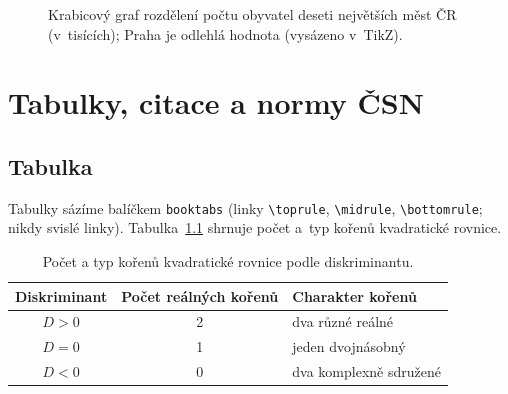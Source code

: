 \documentclass[11pt, a4paper, oneside]{book}
\begin{document}
\begin{figure}[htbp]
\centering
{}
\caption{Krabicový graf rozdělení počtu obyvatel deseti největších měst ČR
(v~tisících); Praha je odlehlá hodnota (vysázeno v~TikZ).}
\label{fig:graf-boxplot}
\end{figure}

\chapter{Tabulky, citace a normy ČSN}
\label{ch:normy}

\section{Tabulka}

Tabulky sázíme balíčkem \texttt{booktabs} (linky \verb|\toprule|, \verb|\midrule|,
\verb|\bottomrule|; nikdy svislé linky). Tabulka~\ref{tab:diskriminant} shrnuje
počet a~typ kořenů kvadratické rovnice.

\begin{table}[htbp]
\centering
\caption{Počet a typ kořenů kvadratické rovnice podle diskriminantu.}
\label{tab:diskriminant}
\begin{tabular}{ccl}
\toprule
Diskriminant & Počet reálných kořenů & Charakter kořenů \\
\midrule
$D > 0$ & 2 & dva různé reálné \\
$D = 0$ & 1 & jeden dvojnásobný \\
$D < 0$ & 0 & dva komplexně sdružené \\
\bottomrule
\end{tabular}
\end{table}
\end{document}
